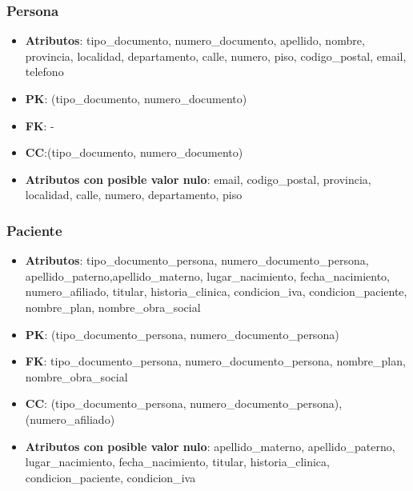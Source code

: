 \documentclass[a4paper,11pt]{article}
\begin{document}
\subsubsection{\textbf{Persona}}

\begin{itemize}

\item 
\textbf{Atributos}: tipo\_documento, numero\_documento, apellido, nombre, provincia, localidad, departamento, calle, numero, piso, codigo\_postal, email, telefono

\item 
\textbf{PK}: (tipo\_documento, numero\_documento)

\item
\textbf{FK}: -

\item 
\textbf{CC}:(tipo\_documento, numero\_documento)

\item 
\textbf{Atributos con posible valor nulo}: email, codigo\_postal, provincia, localidad, calle, numero, departamento, piso	
\end{itemize}

\subsubsection{\textbf{Paciente}}

\begin{itemize}

\item 
\textbf{Atributos}: tipo\_documento\_persona, numero\_documento\_persona, apellido\_paterno,apellido\_materno, lugar\_nacimiento, fecha\_nacimiento,  numero\_afiliado, titular, historia\_clinica, condicion\_iva, condicion\_paciente, nombre\_plan, nombre\_obra\_social

\item 
\textbf{PK}: (tipo\_documento\_persona, numero\_documento\_persona)

\item
\textbf{FK}:  tipo\_documento\_persona, numero\_documento\_persona, nombre\_plan, nombre\_obra\_social

\item 
\textbf{CC}: (tipo\_documento\_persona, numero\_documento\_persona), (numero\_afiliado)

\item 
\textbf{Atributos con posible valor nulo}:  apellido\_materno, apellido\_paterno, lugar\_nacimiento, fecha\_nacimiento, titular, historia\_clinica, condicion\_paciente, condicion\_iva

\end{itemize}
\end{document}
